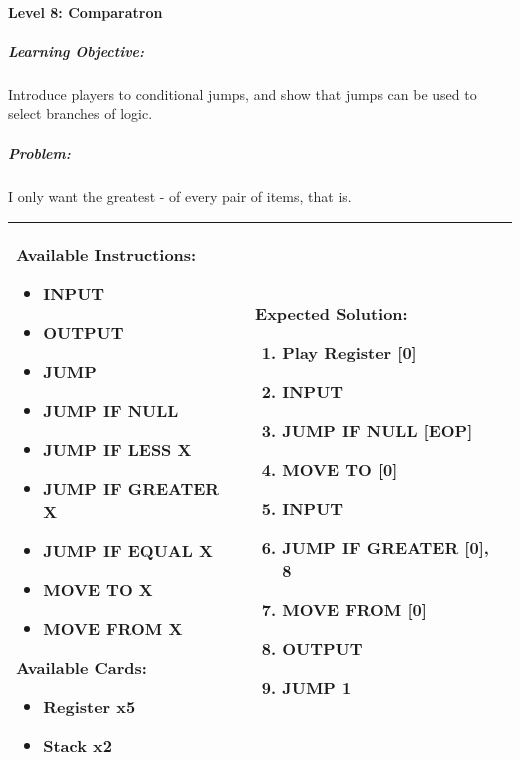 \paragraph{Level 8: Comparatron}
\subparagraph{Learning Objective:} Introduce players to conditional jumps, and show that jumps can be used to select branches of logic.

\subparagraph{Problem:} I only want the greatest - of every pair of items, that is.

\begin{center}
    \begin{tabular}{ | m{6cm} | m{8cm} | } 
        \hline
            \textbf{Available Instructions:} 
            \begin{itemize}
                \setlength\itemsep{-.35em}
                \item INPUT
                \item OUTPUT
                \item JUMP
                \item JUMP IF NULL
                \item JUMP IF LESS X
                \item JUMP IF GREATER X
		\item JUMP IF EQUAL X
                \item MOVE TO X
                \item MOVE FROM X
            \end{itemize}
            \textbf{Available Cards:} 
            \begin{itemize}
                \setlength\itemsep{-.35em}
                \item Register x5
                \item Stack x2
            \end{itemize}& 
            \textbf{Expected Solution:} 
            \begin{enumerate}
                \setlength\itemsep{-.35em}
                \item Play Register [0]
                \item INPUT
	     \item JUMP IF NULL [EOP]
                \item MOVE TO [0]
                \item INPUT
                \item JUMP IF GREATER [0], 8
                \item MOVE FROM [0]
                \item OUTPUT
	     \item JUMP 1
            \end{enumerate}
            \\
        \hline
    \end{tabular}
\end{center}


